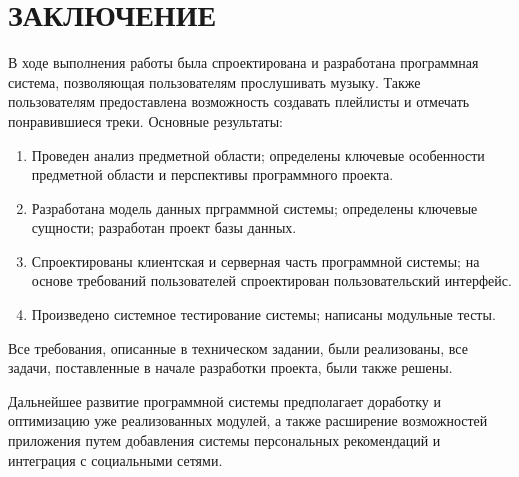 \section*{ЗАКЛЮЧЕНИЕ}
В ходе выполнения работы была спроектирована и разработана программная система, позволяющая пользователям прослушивать музыку. Также пользователям предоставлена возможность создавать плейлисты и отмечать понравившиеся треки.
Основные результаты:
\begin{enumerate}
	\item Проведен анализ предметной области; определены ключевые особенности предметной области и перспективы программного проекта.
	\item Разработана модель данных прграммной системы; определены ключевые сущности; разработан проект базы данных.
	\item Спроектированы клиентская и серверная часть программной системы; на основе требований пользователей спроектирован пользовательский интерфейс.
	\item Произведено системное тестирование системы; написаны модульные тесты.
\end{enumerate}

Все требования, описанные в техническом задании, были реализованы, все задачи, поставленные в начале разработки проекта, были также решены.

Дальнейшее развитие программной системы предполагает доработку и оптимизацию уже реализованных модулей, а также расширение возможностей приложения путем добавления системы персональных рекомендаций и интеграция с социальными сетями.